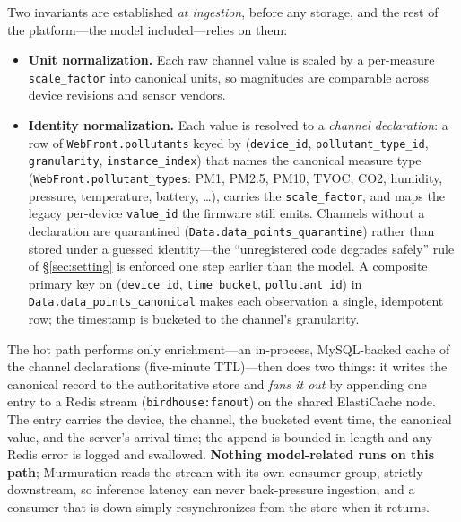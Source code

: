 \documentclass[10pt]{article}
\begin{document}
Two invariants are established \emph{at ingestion}, before any storage, and the
rest of the platform---the model included---relies on them:
\begin{itemize}\itemsep1pt 
\item \textbf{Unit normalization.} Each raw channel value is scaled by a
per-measure \texttt{scale\_factor} into canonical units, so magnitudes are
comparable across device revisions and sensor vendors.
\item \textbf{Identity normalization.} Each value is resolved to a
\emph{channel declaration}: a row of \texttt{WebFront.pollutants} keyed by
(\texttt{device\_id}, \texttt{pollutant\_type\_id}, \texttt{granularity},
\texttt{instance\_index}) that names the canonical measure type
(\texttt{WebFront.pollutant\_types}: PM1, PM2.5, PM10, TVOC, CO2, humidity,
pressure, temperature, battery, \ldots), carries the \texttt{scale\_factor}, and
maps the legacy per-device \texttt{value\_id} the firmware still emits. Channels
without a declaration are quarantined (\texttt{Data.data\_points\_quarantine})
rather than stored under a guessed identity---the ``unregistered code degrades
safely'' rule of \S\ref{sec:setting} is enforced one step earlier than the
model. A composite primary key on (\texttt{device\_id},
\texttt{time\_bucket}, \texttt{pollutant\_id}) in
\texttt{Data.data\_points\_canonical} makes each observation a single,
idempotent row; the timestamp is bucketed to the channel's granularity.
\end{itemize}
The hot path performs only enrichment---an in-process, MySQL-backed cache of the
channel declarations (five-minute TTL)---then does two things: it writes the
canonical record to the authoritative store and \emph{fans it out} by appending
one entry to a Redis stream (\texttt{birdhouse:fanout}) on the shared ElastiCache
node. The entry carries the device, the channel, the bucketed event time, the
canonical value, and the server's arrival time; the append is bounded in length
and any Redis error is logged and swallowed. \textbf{Nothing model-related runs
on this path}; Murmuration reads the stream with its own consumer group, strictly
downstream, so inference latency can never back-pressure ingestion, and a
consumer that is down simply resynchronizes from the store when it returns.
\end{document}
